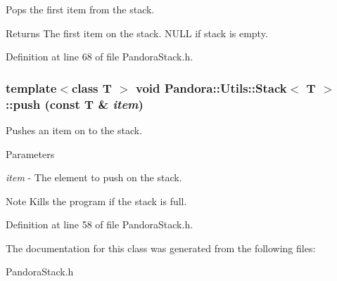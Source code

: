 Pops the first item from the stack. \begin{DoxyReturn}{Returns}
The first item on the stack. NULL if stack is empty. 
\end{DoxyReturn}


Definition at line 68 of file PandoraStack.h.\hypertarget{classPandora_1_1Utils_1_1Stack_a910af8de7eaaa2200515e7efb8251571}{
\subsubsection[{push}]{\setlength{\rightskip}{0pt plus 5cm}template$<$class T $>$ void {\bf Pandora::Utils::Stack}$<$ T $>$::push (const T \& {\em item})}}
\label{classPandora_1_1Utils_1_1Stack_a910af8de7eaaa2200515e7efb8251571}


Pushes an item on to the stack. 
\begin{DoxyParams}{Parameters}
\item[{\em item}]-\/ The element to push on the stack. \end{DoxyParams}
\begin{DoxyNote}{Note}
Kills the program if the stack is full. 
\end{DoxyNote}


Definition at line 58 of file PandoraStack.h.

The documentation for this class was generated from the following files:\begin{DoxyCompactItemize}
\item 
PandoraStack.h\end{DoxyCompactItemize}
